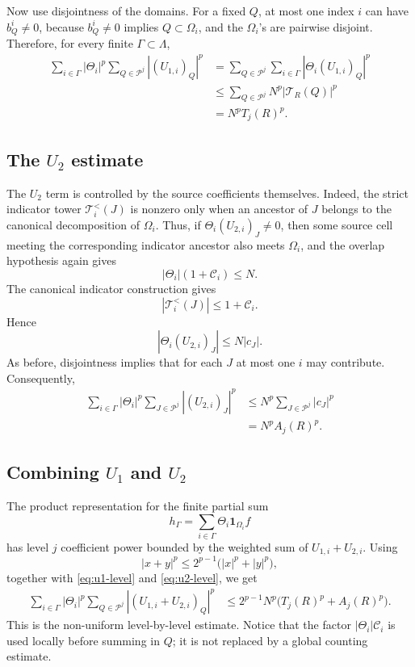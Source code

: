 \documentclass[11pt]{article}
\newcommand{\Pcal}{\mathcal P}
\newcommand{\Ccal}{\mathcal C}
\newcommand{\Tcal}{\mathcal T}
\newcommand{\Om}{\Omega}
\newcommand{\Th}{\Theta}
\newcommand{\1}{\mathbf 1}
\newcommand{\abs}[1]{\left|#1\right|}
\begin{document}
Now use disjointness of the domains.  For a fixed \(Q\), at most one index
\(i\) can have \(b^i_Q\neq0\), because \(b^i_Q\neq0\) implies
\(Q\subset\Om_i\), and the \(\Om_i\)'s are pairwise disjoint.  Therefore, for
every finite \(\Gamma\subset\Lambda\),
\begin{align}
  \sum_{i\in\Gamma}\abs{\Th_i}^p
  \sum_{Q\in\Pcal^j}\abs{(U_{1,i})_Q}^p
  &=
  \sum_{Q\in\Pcal^j}
  \sum_{i\in\Gamma}
  \abs{\Th_i(U_{1,i})_Q}^p
  \nonumber\\
  &\le
  \sum_{Q\in\Pcal^j}
  N^p\abs{\Tcal_R(Q)}^p
  \nonumber\\
  &=
  N^p T_j(R)^p.
  \label{eq:u1-level}
\end{align}

\subsection*{The \(U_2\) estimate}

The \(U_2\) term is controlled by the source coefficients themselves.  Indeed,
the strict indicator tower \(\Tcal_i^{<}(J)\) is nonzero only when an ancestor
of \(J\) belongs to the canonical decomposition of \(\Om_i\).  Thus, if
\(\Th_i(U_{2,i})_J\neq0\), then some source cell meeting the corresponding
indicator ancestor also meets \(\Om_i\), and the overlap hypothesis again gives
\[
  \abs{\Th_i}(1+\Ccal_i)\le N.
\]
The canonical indicator construction gives
\[
  \abs{\Tcal_i^{<}(J)}\le 1+\Ccal_i.
\]
Hence
\[
  \abs{\Th_i(U_{2,i})_J}
  \le
  N\abs{c_J}.
\]
As before, disjointness implies that for each \(J\) at most one \(i\) may
contribute.  Consequently,
\begin{align}
  \sum_{i\in\Gamma}\abs{\Th_i}^p
  \sum_{J\in\Pcal^j}\abs{(U_{2,i})_J}^p
  &\le
  N^p
  \sum_{J\in\Pcal^j}\abs{c_J}^p
  \nonumber\\
  &=
  N^p A_j(R)^p.
  \label{eq:u2-level}
\end{align}

\subsection*{Combining \(U_1\) and \(U_2\)}

The product representation for the finite partial sum
\[
  h_\Gamma
  =
  \sum_{i\in\Gamma}\Th_i\1_{\Om_i}f
\]
has level \(j\) coefficient power bounded by the weighted sum of
\(U_{1,i}+U_{2,i}\).  Using
\[
  \abs{x+y}^p\le 2^{p-1}\bigl(\abs{x}^p+\abs{y}^p\bigr),
\]
together with \eqref{eq:u1-level} and \eqref{eq:u2-level}, we get
\begin{align}
  \sum_{i\in\Gamma}\abs{\Th_i}^p
  \sum_{Q\in\Pcal^j}
  \abs{(U_{1,i}+U_{2,i})_Q}^p
  &\le
  2^{p-1}N^p
  \bigl(T_j(R)^p+A_j(R)^p\bigr).
  \label{eq:level-final}
\end{align}
This is the non-uniform level-by-level estimate.  Notice that the factor
\(\abs{\Th_i}\Ccal_i\) is used locally before summing in \(Q\); it is not
replaced by a global counting estimate.
\end{document}
